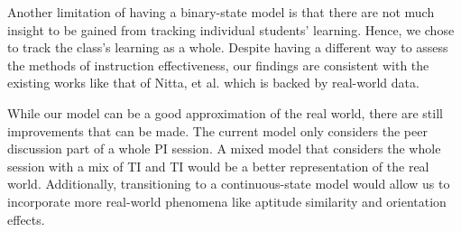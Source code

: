 \documentclass[twocolumn,secnumarabic,amssymb, nobibnotes, aps, prd]{revtex4-2}
\begin{document}
    Another limitation of having a binary-state model is that there are not much insight to be gained from tracking individual students' learning.
    Hence, we chose to track the class's learning as a whole.
    Despite having a different way to assess the methods of instruction effectiveness, our findings are consistent with the existing works like that of Nitta, et al. \cite{nitta2019mathematical} which is backed by real-world data.

    While our model can be a good approximation of the real world, there are still improvements that can be made.
    The current model only considers the peer discussion part of a whole PI session.
    A mixed model that considers the whole session with a mix of TI and TI would be a better representation of the real world.
    Additionally, transitioning to a continuous-state model would allow us to incorporate more real-world phenomena like aptitude similarity and orientation effects.



\end{document}
